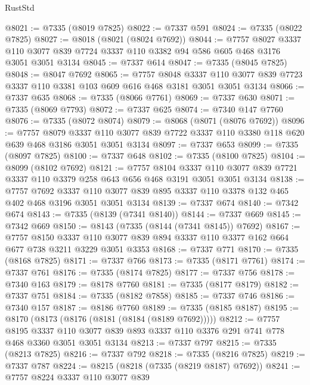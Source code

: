\begin{lexlean}{RustStd}
\begin{coremodule}
{\begin{coremodule}
{{{{{{{{{{{{{{{{{{{{{{{{{{{{{{{{@8021 := @7335 (@8019 @7825)
@8022 := @7337 @591
@8024 := @7335 (@8022 @7825)
@8027 := @8018 (@8021 (@8024 @7692))
@8044 := @7757
    @8027
    @3337
    @110
    @3077
    @839
    @7724
    @3337
    @110
    @3382
    @94
    @586
    @605
    @468
    @3176
    @3051
    @3051
    @3134
@8045 := @7337 @614
@8047 := @7335 (@8045 @7825)
@8048 := @8047 @7692
@8065 := @7757
    @8048
    @3337
    @110
    @3077
    @839
    @7723
    @3337
    @110
    @3381
    @103
    @609
    @616
    @468
    @3181
    @3051
    @3051
    @3134
@8066 := @7337 @635
@8068 := @7335 (@8066 @7761)
@8069 := @7337 @630
@8071 := @7335 (@8069 @7793)
@8072 := @7337 @625
@8074 := @7340 @147 @7760
@8076 := @7335 (@8072 @8074)
@8079 := @8068 (@8071 (@8076 @7692))
@8096 := @7757
    @8079
    @3337
    @110
    @3077
    @839
    @7722
    @3337
    @110
    @3380
    @118
    @620
    @639
    @468
    @3186
    @3051
    @3051
    @3134
@8097 := @7337 @653
@8099 := @7335 (@8097 @7825)
@8100 := @7337 @648
@8102 := @7335 (@8100 @7825)
@8104 := @8099 (@8102 @7692)
@8121 := @7757
    @8104
    @3337
    @110
    @3077
    @839
    @7721
    @3337
    @110
    @3379
    @258
    @643
    @656
    @468
    @3191
    @3051
    @3051
    @3134
@8138 := @7757
    @7692
    @3337
    @110
    @3077
    @839
    @895
    @3337
    @110
    @3378
    @132
    @465
    @402
    @468
    @3196
    @3051
    @3051
    @3134
@8139 := @7337 @674
@8140 := @7342 @674
@8143 := @7335 (@8139 (@7341 @8140))
@8144 := @7337 @669
@8145 := @7342 @669
@8150 := @8143 (@7335 (@8144 (@7341 @8145)) @7692)
@8167 := @7757
    @8150
    @3337
    @110
    @3077
    @839
    @894
    @3337
    @110
    @3377
    @162
    @664
    @677
    @738
    @3211
    @3229
    @3051
    @3353
@8168 := @7337 @771
@8170 := @7335 (@8168 @7825)
@8171 := @7337 @766
@8173 := @7335 (@8171 @7761)
@8174 := @7337 @761
@8176 := @7335 (@8174 @7825)
@8177 := @7337 @756
@8178 := @7340 @163
@8179 := @8178 @7760
@8181 := @7335 (@8177 @8179)
@8182 := @7337 @751
@8184 := @7335 (@8182 @7858)
@8185 := @7337 @746
@8186 := @7340 @157
@8187 := @8186 @7760
@8189 := @7335 (@8185 @8187)
@8195 := @8170 (@8173 (@8176 (@8181 (@8184 (@8189 @7692)))))
@8212 := @7757
    @8195
    @3337
    @110
    @3077
    @839
    @893
    @3337
    @110
    @3376
    @291
    @741
    @778
    @468
    @3360
    @3051
    @3051
    @3134
@8213 := @7337 @797
@8215 := @7335 (@8213 @7825)
@8216 := @7337 @792
@8218 := @7335 (@8216 @7825)
@8219 := @7337 @787
@8224 := @8215 (@8218 (@7335 (@8219 @8187) @7692))
@8241 := @7757
    @8224
    @3337
    @110
    @3077
    @839
}}}}}}}}}}}}}}}}}}}}}}}}}}}}}}}}
\end{coremodule}}
\end{coremodule}
\end{lexlean}
